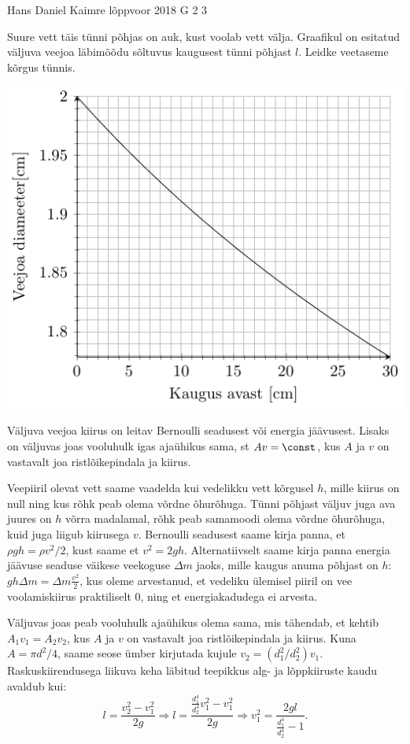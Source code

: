 {Hans Daniel Kaimre} %
{lõppvoor} %
{2018} %
{G 2} %
{3} %
{
\ifStatement
Suure vett täis tünni põhjas on auk, kust voolab vett välja. Graafikul on esitatud väljuva veejoa läbimõõdu sõltuvus kaugusest tünni põhjast $l$. Leidke veetaseme kõrgus tünnis.

\begin{center}
\includegraphics[width = 0.6\linewidth]{2018-v3g-02-juga.pdf}
\end{center}
\fi


\ifHint
Väljuva veejoa kiirus on leitav Bernoulli seadusest või energia jäävusest. Lisaks on väljuvas joas vooluhulk igas ajaühikus sama, st $Av = \const$, kus $A$ ja $v$ on vastavalt joa ristlõikepindala ja kiirus.
\fi


\ifSolution
Veepiiril olevat vett saame vaadelda kui vedelikku vett kõrgusel $h$, mille kiirus on null ning kus rõhk peab olema võrdne õhurõhuga. Tünni põhjast väljuv juga ava juures on $h$ võrra madalamal, rõhk peab samamoodi olema võrdne õhurõhuga, kuid juga liigub kiirusega $v$. Bernoulli seadusest saame kirja panna, et $\rho g h = \rho v^2/2$, kust saame et $v^2=2gh$. Alternatiivselt saame kirja panna energia jäävuse seaduse väikese veekoguse $\Delta m$ jaoks, mille kaugus anuma põhjast on $h$: $ g h \Delta m = \Delta m \frac{v^2}{2}$, kus oleme arvestanud, et vedeliku ülemisel piiril on vee voolamiskiirus praktiliselt 0, ning et energiakadudega ei arvesta.  

Väljuvas joas peab vooluhulk ajaühikus olema sama, mis tähendab, et kehtib $A_1v_1=A_2v_2$, kus $A$ ja $v$ on vastavalt joa ristlõikepindala ja kiirus. Kuna $A=\pi d^2/4$, saame seose ümber kirjutada kujule $v_2=(d_1^2/d_2^2)v_1$. Raskuskiirendusega liikuva keha läbitud teepikkus alg- ja lõppkiiruste kaudu avaldub kui:
$$l=\frac{v_2^2-v_1^2}{2g} \Rightarrow l=\frac{\frac{d_1^4}{d_2^4}v_1^2-v_1^2}{2g} \Rightarrow v_1^2=\frac{2gl}{\frac{d_1^4}{d_2^4}-1}.$$

}
